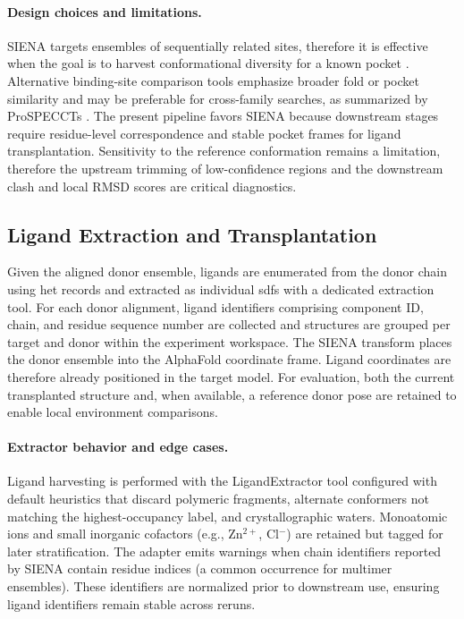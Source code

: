 \paragraph{Design choices and limitations.}
SIENA targets ensembles of sequentially related sites, therefore it is effective when the goal is to harvest conformational diversity for a known pocket \cite{bietzSIENAEfficientCompilation2016a,bietzASCONARapidDetection2015}. Alternative binding-site comparison tools emphasize broader fold or pocket similarity and may be preferable for cross-family searches, as summarized by ProSPECCTs \cite{ehrtBenchmarkDrivenGuide2018}. The present pipeline favors SIENA because downstream stages require residue-level correspondence and stable pocket frames for ligand transplantation. Sensitivity to the reference conformation remains a limitation, therefore the upstream trimming of low-confidence regions and the downstream clash and local RMSD scores are critical diagnostics.

\subsection{Ligand Extraction and Transplantation}\label{subsec:ligand}
Given the aligned donor ensemble, ligands are enumerated from the donor chain
using \gls{het} records and extracted as individual \glspl{sdf} with a dedicated
extraction tool. For each donor alignment, ligand identifiers comprising component ID, chain, and residue sequence number are collected and structures are grouped per target and donor within the experiment workspace. The SIENA
transform places the donor ensemble into the AlphaFold coordinate frame. Ligand
coordinates are therefore already positioned in the target model. For
evaluation, both the current transplanted structure and, when
available, a reference donor pose are retained to enable
local environment comparisons.

\paragraph{Extractor behavior and edge cases.} Ligand harvesting is performed with the LigandExtractor tool configured with default heuristics that discard polymeric fragments, alternate conformers not matching the highest-occupancy label, and crystallographic waters. Monoatomic ions and small inorganic cofactors (e.g., Zn$^{2+}$, Cl$^{-}$) are retained but tagged for later stratification. The adapter emits warnings when chain identifiers reported by SIENA contain residue indices (a common occurrence for multimer ensembles). These identifiers are normalized prior to downstream use, ensuring ligand identifiers remain stable across reruns.

